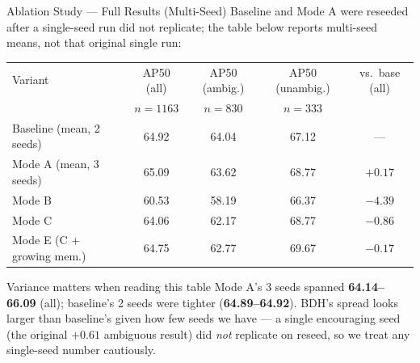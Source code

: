 \documentclass[aspectratio=169]{beamer}
\begin{document}
\begin{frame}{Ablation Study — Full Results (Multi-Seed)}
  \footnotesize Baseline and Mode A were reseeded after a single-seed
  run did not replicate; the table below reports multi-seed means, not
  that original single run:
  \begin{table}
    \centering\footnotesize
    \begin{tabular}{lcccc}
      \toprule
      Variant & AP50 (all) & AP50 (ambig.) & AP50 (unambig.) & vs.\ base (all) \\
      & $n{=}1163$ & $n{=}830$ & $n{=}333$ & \\
      \midrule
      Baseline (mean, 2 seeds) & 64.92 & 64.04 & 67.12 & --- \\
      Mode A (mean, 3 seeds)   & 65.09 & 63.62 & 68.77 & $+0.17$ \\
      Mode B                  & 60.53 & 58.19 & 66.37 & $-4.39$ \\
      Mode C                  & 64.06 & 62.17 & 68.77 & $-0.86$ \\
      Mode E (C + growing mem.) & 64.75 & 62.77 & 69.67 & $-0.17$ \\
      \bottomrule
    \end{tabular}
  \end{table}
  \vspace{0.15cm}
  \begin{alertblock}{Variance matters when reading this table}
    \footnotesize Mode A's 3 seeds spanned \textbf{64.14--66.09} (all);
    baseline's 2 seeds were tighter (\textbf{64.89--64.92}). BDH's
    spread looks larger than baseline's given how few seeds we have —
    a single encouraging seed (the original $+0.61$ ambiguous result)
    did \emph{not} replicate on reseed, so we treat any single-seed
    number cautiously.
  \end{alertblock}
\end{frame}
\end{document}

